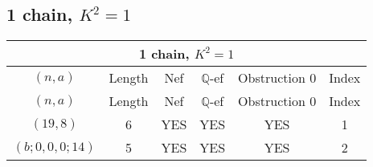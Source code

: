 \subsection{1 chain, $K^2 = 1$}
\begin{longtable}{|c|c|c|c|c|c|}
\hline
\multicolumn{6}{|c|}{1 chain, $K^2 = 1$}\\
\hline
$(n,a)$ & Length & Nef & $\mathbb Q$-ef & Obstruction 0 & Index\\
\hline
\endfirsthead

\hline
$(n,a)$ & Length & Nef & $\mathbb Q$-ef & Obstruction 0 & Index\\
\hline
\endhead
\hline
\endfoot

$(19, 8)$ & 6 & YES & YES & YES & 1\\
$(b; 0, 0, 0; 14)$ & 5 & YES & YES & YES & 2
\end{longtable}
